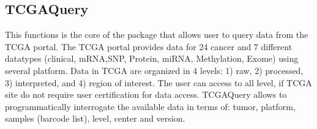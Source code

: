 

\subsection{TCGAQuery}

This functions is the core of the package that allows user to query data from the TCGA portal. 
The  TCGA portal provides data  for 24 cancer and   7 different datatypes  (clinical,  mRNA,SNP, Protein, miRNA,
Methylation, Exome) using several platform.
Data in TCGA are organized in 4 levels: 1) raw, 2) processed, 3) interpreted, and 4) region of interest. The user can access to all level, if TCGA site do not require user certification for data access.
TCGAQuery allows to programmatically interrogate the  available data in terms of:
tumor, platform, samples (barcode list), level, center and version.


%



